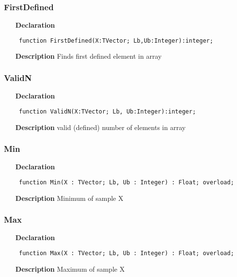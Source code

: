 \documentclass[12pt,a4paper,oneside]{report}
\newcommand{\declarationitem}[1]{\textbf{#1}}
\newcommand{\descriptiontitle}[1]{\textbf{#1}}
\newcommand{\code}[1]{\texttt{#1}}
\begin{document}
\subsubsection{FirstDefined}
\label{umeansd_md-FirstDefined}
\begin{itemize}\item[\declarationitem{Declaration}\hfill]
	\begin{flushleft}
		\code{
			function FirstDefined(X:TVector; Lb,Ub:Integer):integer;}
	\end{flushleft}
	\item[\descriptiontitle{Description}]
	Finds first defined element in array
\end{itemize}
\subsubsection{ValidN}
\label{umeansd_md-ValidN}
\begin{itemize}\item[\declarationitem{Declaration}\hfill]
	\begin{flushleft}
		\code{
			function ValidN(X:TVector; Lb, Ub:Integer):integer;}
	\end{flushleft}
	\item[\descriptiontitle{Description}]
	valid (defined) number of elements in array
\end{itemize}
\subsubsection{Min}
\label{umeansd_md-Min}
\begin{itemize}\item[\declarationitem{Declaration}\hfill]
	\begin{flushleft}
		\code{
			function Min(X : TVector; Lb, Ub : Integer) : Float; overload;}
	\end{flushleft}
	\item[\descriptiontitle{Description}]
	Minimum of sample X
\end{itemize}
\subsubsection{Max}
\label{umeansd_md-Max}
\begin{itemize}\item[\declarationitem{Declaration}\hfill]
	\begin{flushleft}
		\code{
			function Max(X : TVector; Lb, Ub : Integer) : Float; overload;}
	\end{flushleft}
	\item[\descriptiontitle{Description}]
	Maximum of sample X
\end{itemize}
\end{document}
